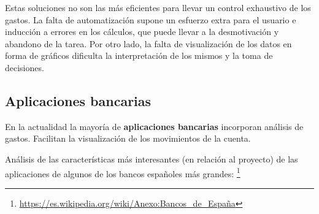     
    


Estas soluciones no son las más eficientes para llevar un control exhaustivo de los gastos. La falta de automatización supone un esfuerzo extra para el usuario e inducción a errores en los cálculos, que puede llevar a la desmotivación y abandono de la tarea. Por otro lado, la falta de visualización de 
los datos en forma de gráficos dificulta la interpretación de los mismos y la toma de decisiones.

\subsection{Aplicaciones bancarias}
En la actualidad la mayoría de \textbf{aplicaciones bancarias} incorporan análisis de gastos. 
Facilitan la visualización de los movimientos de la cuenta. 

Análisis de las características más interesantes (en relación al proyecto) 
de las aplicaciones de algunos de los bancos españoles más grandes:
\footnote{\url{https://es.wikipedia.org/wiki/Anexo:Bancos_de_España}}

